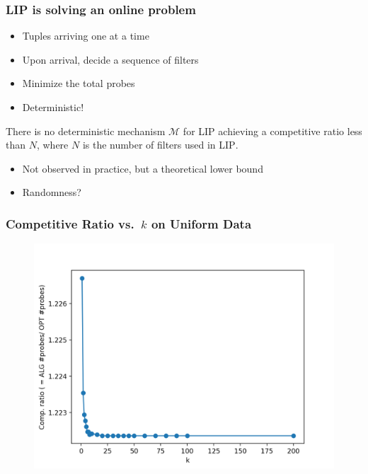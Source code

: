 \documentclass{beamer}
\begin{document}
\begin{frame}
\frametitle{LIP is solving an online problem}
\begin{itemize}
  \item Tuples arriving one at a time
  \item Upon arrival, decide a sequence of filters
  \item Minimize the total probes
  \item Deterministic! \pause
\end{itemize}

\begin{theorem}
  There is no deterministic mechanism $\mathcal{M}$ for \textsc{LIP} achieving a competitive ratio less than $N$, where $N$ is the number of filters used in \textsc{LIP}.
\end{theorem}

\pause
\begin{itemize}
  \item Not observed in practice, but a theoretical lower bound
  \item Randomness?
\end{itemize}

\end{frame}



\begin{frame}
  \frametitle{Competitive Ratio vs.\ $k$ on Uniform Data}
  \begin{figure}
    \centering
    \includegraphics[height=0.7\textheight,keepaspectratio]{cr-k-uniform}
  \end{figure}
\end{frame}
\end{document}
